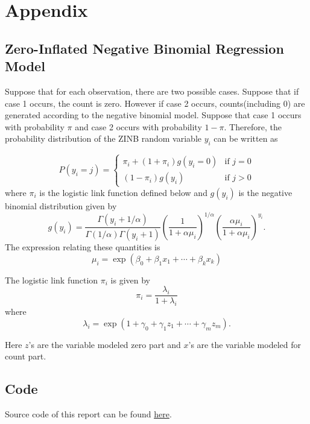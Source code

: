 \documentclass[
]{article}
\begin{document}
\hypertarget{appendix}{%
\section{Appendix}\label{appendix}}

\hypertarget{zero-inflated-negative-binomial-regression-model}{%
\subsection{Zero-Inflated Negative Binomial Regression
Model}\label{zero-inflated-negative-binomial-regression-model}}

Suppose that for each observation, there are two possible cases. Suppose
that if case 1 occurs, the count is zero. However if case 2 occurs,
counts(including 0) are generated according to the negative binomial
model. Suppose that case 1 occurs with probability \(\pi\) and case 2
occurs with probability \(1-\pi\). Therefore, the probability
distribution of the ZINB random variable \(y_i\) can be written as

\[
P(y_i = j) = 
\begin{cases}
\pi_i + (1+\pi_i) g(y_i=0) & \text{if }j=0 \\
(1-\pi_i) g(y_i)           & \text{if }j>0
\end{cases}
\] where \(\pi_i\) is the logistic link function defined below and
\(g(y_i)\) is the negative binomial distribution given by \[
g(y_i) = \frac{\Gamma(y_i + 1/\alpha)}{\Gamma(1/\alpha) \Gamma(y_i+1)}\left( \frac{1}{1 + \alpha \mu_i}\right)^{1/\alpha}\left( \frac{\alpha \mu_i}{1 + \alpha \mu_i}\right)^{y_i}.
\] The expression relating these quantities is \[
\mu_i = \exp(\beta_0 + \beta_1 x_1 + \cdots + \beta_k x_k)
\]

The logistic link function \(\pi_i\) is given by \[
\pi_i = \frac{\lambda_i}{1 + \lambda_i}
\] where \[
\lambda_i = \exp(1 + \gamma_0 + \gamma_1 z_1 + \cdots + \gamma_m z_m).
\]

Here \(z\)'s are the variable modeled zero part and \(x\)'s are the
variable modeled for count part.

\hypertarget{code}{%
\subsection{Code}\label{code}}

Source code of this report can be found \href{link}{here}.
\end{document}

